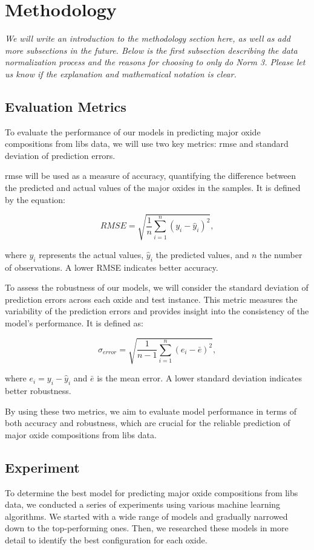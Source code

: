 \section{Methodology}\label{sec:methodology}
\textit{We will write an introduction to the methodology section here, as well as add more subsections in the future. Below is the first subsection describing the data normalization process and the reasons for choosing to only do Norm 3. Please let us know if the explanation and mathematical notation is clear.}

\subsection{Evaluation Metrics}
To evaluate the performance of our models in predicting major oxide compositions from \gls{libs} data, we will use two key metrics: \gls{rmse} and standard deviation of prediction errors.

\gls{rmse} will be used as a measure of accuracy, quantifying the difference between the predicted and actual values of the major oxides in the samples. It is defined by the equation:

\begin{equation}
    RMSE = \sqrt{\frac{1}{n} \sum_{i=1}^{n} (y_i - \hat{y}_i)^2},
\end{equation}

where $y_i$ represents the actual values, $\hat{y}_i$ the predicted values, and $n$ the number of observations. A lower RMSE indicates better accuracy.

To assess the robustness of our models, we will consider the standard deviation of prediction errors across each oxide and test instance. This metric measures the variability of the prediction errors and provides insight into the consistency of the model's performance. It is defined as:

\begin{equation}
    \sigma_{error} = \sqrt{\frac{1}{n-1} \sum_{i=1}^{n} (e_i - \bar{e})^2},
\end{equation}

where $e_i = y_i - \hat{y}_i$ and $\bar{e}$ is the mean error. A lower standard deviation indicates better robustness.

By using these two metrics, we aim to evaluate model performance in terms of both accuracy and robustness, which are crucial for the reliable prediction of major oxide compositions from \gls{libs} data.

\subsection{Experiment}
To determine the best model for predicting major oxide compositions from \gls{libs} data, we conducted a series of experiments using various machine learning algorithms.
We started with a wide range of models and gradually narrowed down to the top-performing ones.
Then, we researched these models in more detail to identify the best configuration for each oxide.

